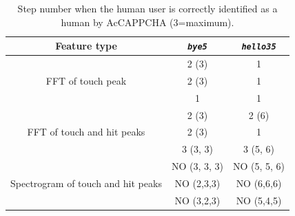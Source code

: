 \begin{table}[H]
\centering\footnotesize
\begin{tabular}{ccc}
\hline
{\textbf{Feature type}}&{\texttt{\textit{bye5}}}&{\texttt{\textit{hello35}}}\\
\hline
\multirow{3}{*}{FFT of touch peak} & {2 (3)} & {1}\\
& {2 (3)} & {1}\\
& {1} & {1}\\
\hline
\multirow{3}{*}{FFT of touch and hit peaks} & {2 (3)} & {2 (6)}\\
& {2 (3)} & {1}\\
& {3 (3, 3)} & {3 (5, 6)}\\
\hline
\multirow{3}{*}{Spectrogram of touch and hit peaks} & {NO (3, 3, 3)} & {NO (5, 5, 6)}\\
& {NO (2,3,3)} & {NO (6,6,6)}\\
& {NO (3,2,3)} & {NO (5,4,5)}\\
\hline
\end{tabular}
\caption{\footnotesize{Step number when the human user is correctly identified as a human by AcCAPPCHA (3=maximum).}}
\label{Results:verification}
\end{table}

